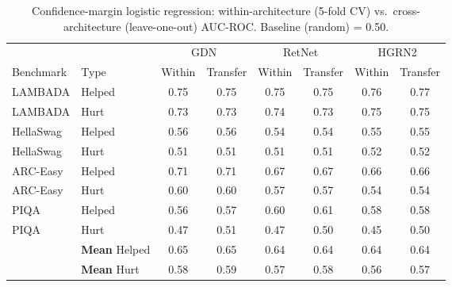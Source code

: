 \begin{table}[t]
\centering
\small
\caption{Confidence-margin logistic regression: within-architecture (5-fold CV) vs.\ cross-architecture (leave-one-out) AUC-ROC. Baseline (random) = 0.50.}
\label{tab:prediction_auc}
\begin{tabular}{llcccccc}
\toprule
 & & \multicolumn{2}{c}{GDN} & \multicolumn{2}{c}{RetNet} & \multicolumn{2}{c}{HGRN2} \\
\cmidrule(lr){3-4} \cmidrule(lr){5-6} \cmidrule(lr){7-8}
Benchmark & Type & Within & Transfer & Within & Transfer & Within & Transfer \\
\midrule
LAMBADA & Helped & 0.75 & 0.75 & 0.75 & 0.75 & 0.76 & 0.77 \\
LAMBADA & Hurt & 0.73 & 0.73 & 0.74 & 0.73 & 0.75 & 0.75 \\
\addlinespace
HellaSwag & Helped & 0.56 & 0.56 & 0.54 & 0.54 & 0.55 & 0.55 \\
HellaSwag & Hurt & 0.51 & 0.51 & 0.51 & 0.51 & 0.52 & 0.52 \\
\addlinespace
ARC-Easy & Helped & 0.71 & 0.71 & 0.67 & 0.67 & 0.66 & 0.66 \\
ARC-Easy & Hurt & 0.60 & 0.60 & 0.57 & 0.57 & 0.54 & 0.54 \\
\addlinespace
PIQA & Helped & 0.56 & 0.57 & 0.60 & 0.61 & 0.58 & 0.58 \\
PIQA & Hurt & 0.47 & 0.51 & 0.47 & 0.50 & 0.45 & 0.50 \\
\midrule
 & \textbf{Mean} Helped & 0.65 & 0.65 & 0.64 & 0.64 & 0.64 & 0.64 \\
 & \textbf{Mean} Hurt & 0.58 & 0.59 & 0.57 & 0.58 & 0.56 & 0.57 \\
\bottomrule
\end{tabular}
\end{table}